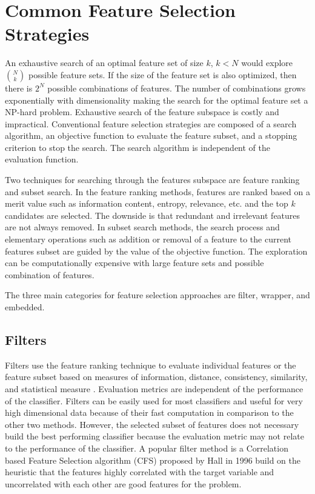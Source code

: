 \section{Common Feature Selection Strategies}
\indent An exhaustive search of an optimal feature set of size \(k\), \(k < N\) would explore \(N\choose k\) possible feature sets. If the size of the feature set is also optimized, then there is \(2^N\) possible combinations of features. The number of combinations grows exponentially with dimensionality making the search for the optimal feature set a NP-hard problem. Exhaustive search of the feature subspace is costly and impractical. Conventional feature selection strategies are composed of a search algorithm, an objective function to evaluate the feature subset, and a stopping criterion to stop the search. The search algorithm is independent of the evaluation function.

Two techniques for searching through the features subspace are feature ranking and subset search. In the feature ranking methods, features are ranked based on a merit value such as information content, entropy, relevance, etc. and the top \(k\) candidates are selected. The downside is that redundant and irrelevant features are not always removed. In subset search methods, the search process and elementary operations such as addition or removal of a feature to the current features subset are guided by the value of the objective function. The exploration can be computationally expensive with large feature sets and possible combination of features. 

The three main categories for feature selection approaches are filter, wrapper, and embedded. 
\subsection{Filters}
\indent Filters use the feature ranking technique to evaluate individual features or the feature subset based on measures of information, distance, consistency, similarity, and statistical measure \cite{ReviewOfFS}. Evaluation metrics are independent of the performance of the classifier. Filters can be easily used for most classifiers and useful for very high dimensional data because of their fast computation in comparison to the other two methods. However, the selected subset of features does not necessary build the best performing classifier because the evaluation metric may not relate to the performance of the classifier. A popular filter method is a Correlation based Feature Selection algorithm (CFS) proposed by Hall in 1996 \cite{FSAlgo} build on the heuristic that the features highly correlated with the target variable and uncorrelated with each other are good features for the problem. 

